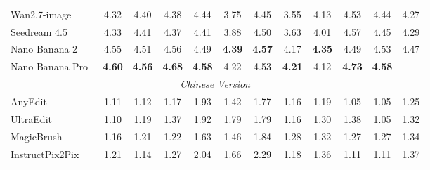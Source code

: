 \begin{table}[t]
{\begin{tabular}{l|cccccccccc|c}
            

            Wan2.7-image~\cite{nanobananapro}
            & 4.32 & 4.40 & 4.38 & 4.44 & 3.75 & 4.45 & 3.55 & 4.13 & 4.53 & 4.44
            & \cellcolor[HTML]{C8C8C8} 4.27  \\

            Seedream 4.5~\cite{seedream2025seedream}
            & 4.33 & 4.41 & 4.37 & 4.41 & 3.88 & 4.50 & 3.63 & 4.01 & 4.57 & 4.45
            & \cellcolor[HTML]{C8C8C8}4.29 \\

            Nano Banana 2~\cite{gemini3pro}
            & 4.55 & 4.51 & 4.56 & 4.49 & \color[HTML]{319B62}\textbf{4.39} & \color[HTML]{319B62}\textbf{4.57} & 4.17 & \color[HTML]{319B62}\textbf{4.35} & 4.49 & 4.53
            & \cellcolor[HTML]{C8C8C8} 4.47 \\

            Nano Banana Pro~\cite{nanobananapro}
            & \color[HTML]{319B62}\textbf{4.60} & \color[HTML]{319B62}\textbf{4.56} & \color[HTML]{319B62}\textbf{4.68} & \color[HTML]{319B62}\textbf{4.58} & 4.22 & 4.53 & \color[HTML]{319B62}\textbf{4.21} & 4.12 & \color[HTML]{319B62}\textbf{4.73} & \color[HTML]{319B62}\textbf{4.58}
            & \cellcolor[HTML]{C8C8C8}{\color[HTML]{319B62}\textbf{4.51}} \\

 

            

            \midrule
            \multicolumn{12}{c}{\textit{Chinese Version}} \\
            \midrule

            AnyEdit~\cite{yu2025anyedit}
            & 1.11 & 1.12 & 1.17 & 1.93 & 1.42 & 1.77 & 1.16 & 1.19 & 1.05 & 1.05
            & \cellcolor[HTML]{C8C8C8}1.25 \\

            UltraEdit~\cite{zhao2024ultraedit}
            & 1.10 & 1.19 & 1.37 & 1.92 & 1.79 & 1.79 & 1.16 & 1.30 & 1.38 & 1.05
            & \cellcolor[HTML]{C8C8C8}1.32 \\

            MagicBrush~\cite{zhang2023magicbrush}
            & 1.16 & 1.21 & 1.22 & 1.63 & 1.46 & 1.84 & 1.28 & 1.32 & 1.27 & 1.27
            & \cellcolor[HTML]{C8C8C8}1.34 \\

            InstructPix2Pix~\cite{brooks2023instructpix2pix}
            & 1.21 & 1.14 & 1.27 & 2.04 & 1.66 & 2.29 & 1.18 & 1.36 & 1.11 & 1.11
            & \cellcolor[HTML]{C8C8C8}1.37 \\


\end{tabular}}
\end{table}
